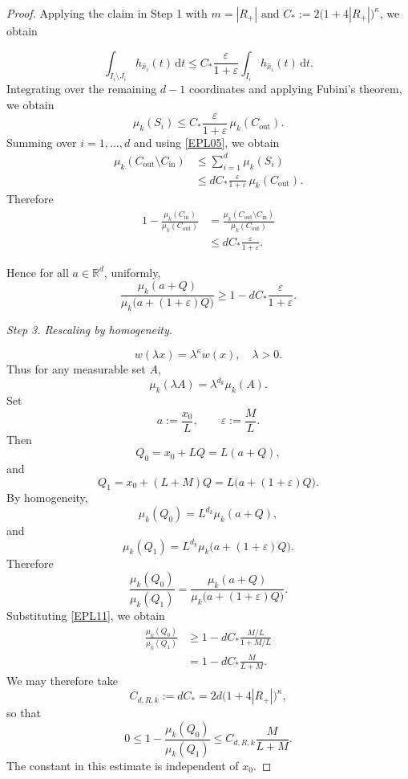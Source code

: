 \documentclass[10pt,a4paper]{amsart}
\begin{document}
\begin{proof}
Applying the claim in Step 1 with $m=|R_+|$ and $C_* := 2\bigl(1+4|R_+|\bigr)^{\kappa}$, we obtain

\begin{equation}
\int_{I_i\setminus J_i} h_{\widehat{x}_i}(t)\,\mathrm{d}t
\le C_*\frac{\varepsilon}{1+\varepsilon}\int_{I_i} h_{\widehat{x}_i}(t)\,\mathrm{d}t.
\end{equation}
Integrating over the remaining $d-1$ coordinates and applying Fubini's theorem, we obtain
\begin{equation}
\mu_k(S_i)\le C_*\frac{\varepsilon}{1+\varepsilon}\,\mu_k(C_{\mathrm{out}}).
\end{equation}
Summing over $i=1,\dots,d$ and using \eqref{EPL05}, we obtain
\[
\begin{aligned}
\mu_k(C_{\mathrm{out}}\setminus C_{\mathrm{in}})
&\le \sum_{i=1}^{d}\mu_k(S_i) \\
&\le d C_*\frac{\varepsilon}{1+\varepsilon}\,\mu_k(C_{\mathrm{out}}).
\end{aligned}
\]
Therefore
\[
\begin{aligned}
1-\frac{\mu_k(C_{\mathrm{in}})}{\mu_k(C_{\mathrm{out}})}
&=\frac{\mu_k(C_{\mathrm{out}}\setminus C_{\mathrm{in}})}{\mu_k(C_{\mathrm{out}})} \\
&\le d C_*\frac{\varepsilon}{1+\varepsilon}.
\end{aligned}
\]

Hence for all $a\in\mathbb{R}^d$, uniformly,
\begin{equation}\label{EPL11}
\frac{\mu_k(a+Q)}{\mu_k\bigl(a+(1+\varepsilon)Q\bigr)}
\ge 1- d C_*\frac{\varepsilon}{1+\varepsilon}.
\end{equation}


\emph{Step 3. Rescaling by homogeneity.}

\[
w(\lambda x)=\lambda^{\kappa} w(x),\quad \lambda>0.
\]
Thus for any measurable set $A$,
\[
\mu_k(\lambda A)=\lambda^{d_k}\mu_k(A).
\]
Set
\[
a:=\frac{x_0}{L},\qquad \varepsilon:=\frac{M}{L}.
\]
Then
\[
Q_0=x_0+LQ=L(a+Q),
\]
and
\[
Q_1=x_0+(L+M)Q=L\bigl(a+(1+\varepsilon)Q\bigr).
\]
By homogeneity,
\[
\mu_k(Q_0)=L^{d_k}\mu_k(a+Q),
\]
and
\[
\mu_k(Q_1)=L^{d_k}\mu_k\bigl(a+(1+\varepsilon)Q\bigr).
\]
Therefore
\[
\frac{\mu_k(Q_0)}{\mu_k(Q_1)}
=\frac{\mu_k(a+Q)}{\mu_k\bigl(a+(1+\varepsilon)Q\bigr)}.
\]
Substituting \eqref{EPL11}, we obtain
\begin{equation}\label{EPL15}
\begin{aligned}
\frac{\mu_k(Q_0)}{\mu_k(Q_1)}
&\ge 1- d C_*\frac{M/L}{1+M/L} \\
&=1- d C_*\frac{M}{L+M}.
\end{aligned}
\end{equation}
We may therefore take
\[
C_{d,R,k}:= d C_* = 2d\bigl(1+4|R_+|\bigr)^{\kappa},
\]
so that
\[
0\le 1-\frac{\mu_k(Q_0)}{\mu_k(Q_1)}
\le C_{d,R,k}\frac{M}{L+M}.
\]
The constant in this estimate is independent of $x_0$.


\end{proof}
\end{document}
